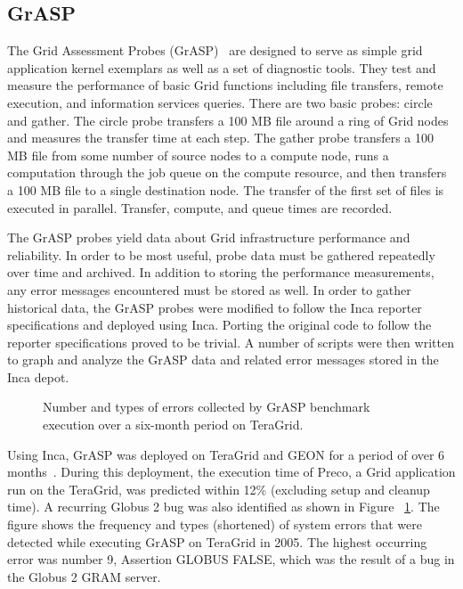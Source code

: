 \documentclass{sig-alternate}
\begin{document}
\subsection{GrASP}
\label{grasp}

The Grid Assessment Probes (GrASP)~\cite{grasp} are designed to 
serve as simple grid application kernel exemplars as well as a 
set of diagnostic tools. They test and measure the performance of 
basic Grid functions including file transfers, remote execution, 
and information services queries.  There are two basic probes: circle and 
gather.  The circle probe transfers a 100 MB file around a ring of
Grid nodes and measures the transfer time at each step.  The gather probe
transfers a 100 MB file from some number of source nodes to a compute node,
runs a computation through the job queue on the compute resource, and then
transfers a 100 MB file to a single destination node.  The transfer of the
first set of files is executed in parallel.  Transfer, compute, and queue times are recorded.

The GrASP probes yield data about Grid infrastructure performance and reliability.
In order to be most useful, probe data must be gathered 
repeatedly over time and archived.
In addition to storing the performance measurements,
any error messages encountered must be stored as well.    
In order to
gather historical data, the GrASP probes were modified
to follow the Inca reporter specifications and deployed using Inca.
Porting the original code to follow the reporter specifications proved to be
trivial.  A number of scripts were then written to graph and analyze the GrASP
data and related error messages stored in the Inca depot.  

\begin{figure}[tbp]
  \centering
  \mbox{}
  \caption{\label{errorHist_fig} Number and types of errors collected by
  GrASP benchmark execution over a six-month period on TeraGrid.}
\end{figure}

Using Inca, GrASP was deployed on TeraGrid and GEON for a period of over 6
months~\cite{grasp2}.  During this deployment, the execution time of Preco, 
a Grid application run on the TeraGrid, was predicted within 12\% (excluding setup and cleanup time).
A recurring Globus 2 bug was also identified as shown in Figure ~\ref{errorHist_fig}.  The figure shows the frequency and types (shortened) of 
system errors that were detected while executing 
GrASP on TeraGrid in 2005. The highest occurring
error was number 9, Assertion GLOBUS FALSE, which was the result of a bug in
the Globus 2 GRAM server.  
\end{document}
